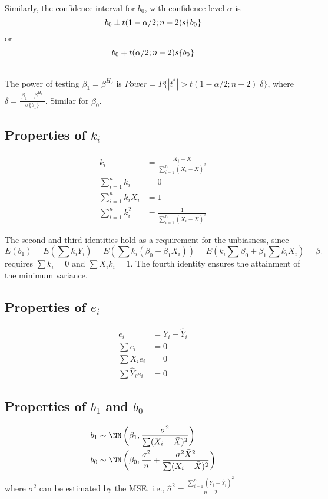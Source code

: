 Similarly, the confidence interval for $b_0$, with confidence level $\alpha$ is
\begin{equation}
	b_0 \pm t(1-\alpha/2;n-2)s\{b_0\}\\
\end{equation}
or
\begin{equation}
	b_0 \mp t(\alpha/2;n-2)s\{b_0\}\\
\end{equation}

\noindent
\\
The power of testing $\beta_1 = \beta^{H_0}$ is $Power = P\{|t^*|>t(1-\alpha/2;n-2)|\delta\}$, where $\delta = \frac{|\beta_1 - \beta^{H_0}|}{\sigma\{b_1\}}$. Similar for $\beta_0$.

\subsection{Properties of $k_i$}
\begin{align}
	k_i &= \frac{X_i - \bar X}{\sum_{i=1}^n (X_i-\bar X)^2}\\
	\sum_{i=1}^n k_i &= 0\\
	\sum_{i=1}^n k_i X_i &= 1\\
	\sum_{i=1}^n k_i^2 &= \frac{1}{\sum_{i=1}^n(X_i - \bar X)^2}
\end{align}

The second and third identities hold as a requirement for the unbiasness, since $$E(b_1) = E\left(\sum k_i Y_i\right)= E\left(\sum k_i (\beta_0+\beta_1 X_i)\right) = E\left(k_i \sum\beta_0 + \beta_1 \sum k_i X_i \right) = \beta_1$$ requires $\sum k_i = 0$  and $\sum X_i k_i = 1$.
The fourth identity ensures the attainment of the minimum variance.


\subsection{Properties of $e_i$}
\begin{align}
	e_i & = Y_i - \hat Y_i \\
	\sum e_i & = 0 \\
	\sum X_i e_i & = 0 \\
	\sum \hat Y_i e_i & = 0
\end{align}

\subsection{Properties of $b_1$ and $b_0$}
\begin{align}
	b_1 &\sim \NN \left(\beta_1,\frac{\sigma^2}{\sum(X_i-\bar X)^2}\right) \\
	b_0 &\sim \NN \left(\beta_0,\frac{\sigma^2}{n} + \frac{\sigma^2 {\bar X}^2}{\sum(X_i-\bar X)^2} \right)
\end{align}
where $\sigma^2$ can be estimated by the MSE, i.e., $\hat \sigma^2 = \frac{\sum_{i=1}^n (Y_i - \hat Y_i)^2}{n-2}$

